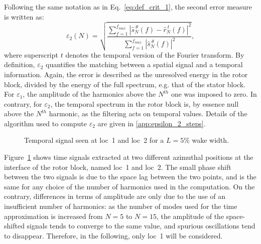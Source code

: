 Following the same notation as in Eq.~\eqref{eq:def_crit_1}, 
the second error measure is written as:
\begin{equation}
    \varepsilon_2(N) = \sqrt{
    \frac{\sum_{f=1}^{f_{max}} | \widehat{s}^{~\theta}_N (f) - 
      \widehat{r}^{~t}_N (f)|^2}{ 
    \sum_{f=1}^{f_{max}} | \widehat{s}^{~\theta}_N (f)|^2}},
    \label{eq:def_crit_2}
\end{equation}
where superscript $t$ denotes the temporal version of
the Fourier transform.
By definition, $\varepsilon_2$
quantifies the matching between a spatial signal
and a temporal information.
Again, the error is described as the unresolved energy 
in the rotor block, 
divided by the energy of the full spectrum, 
e.g. that of the stator block. 
For $\varepsilon_1$, the amplitude 
of the harmonics above the $N^{th}$ one was imposed to zero. 
In contrary, for $\varepsilon_2$, the temporal spectrum 
in the rotor block is, 
by essence null above the $N^{th}$ harmonic, as the filtering 
acts on temporal values. 
Details of the algorithm used to compute $\varepsilon_2$ are given in \ref{app:epsilon_2_steps}.

\begin{figure}[htb]
\centering
  \caption{Temporal signal seen at loc~1 and loc~2 for a $L=5\%$ wake width.}
  \label{fig:temp_signal}
\end{figure}
Figure~\ref{fig:temp_signal} shows time signals
extracted at two different azimuthal positions at 
the interface of the rotor block, named loc~1 and loc~2. 
The small phase shift between the two 
signals is due to the space lag between the two points, 
and is the same for any choice of the number of 
harmonics used in the computation. On the contrary, 
differences in terms of amplitude are only due 
to the use of an insufficient number of harmonics: 
as the number of modes used for the time 
approximation is increased from $N=5$ to $N=15$, 
the amplitude of the space-shifted signals 
tends to converge to the same value, and 
spurious oscillations tend to disappear. Therefore, in the following,
only loc~1 will be considered.

